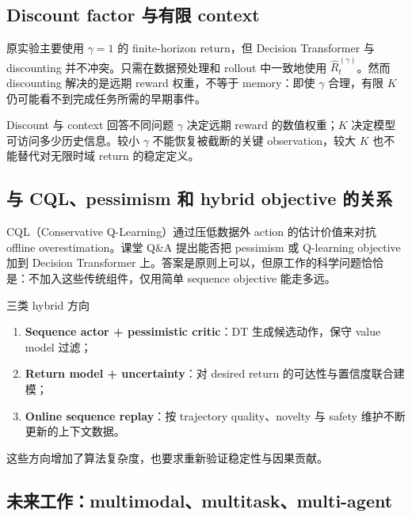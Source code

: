 
\subsection{Discount factor 与有限 context}

原实验主要使用 $\gamma=1$ 的 finite-horizon return，但 Decision Transformer 与 discounting 并不冲突。只需在数据预处理和 rollout 中一致地使用 $\widehat{R}^{(\gamma)}_t$。然而 discounting 解决的是远期 reward 权重，不等于 memory：即使 $\gamma$ 合理，有限 $K$ 仍可能看不到完成任务所需的早期事件。

\begin{importantbox}{Discount 与 context 回答不同问题}
$\gamma$ 决定远期 reward 的数值权重；$K$ 决定模型可访问多少历史信息。较小 $\gamma$ 不能恢复被截断的关键 observation，较大 $K$ 也不能替代对无限时域 return 的稳定定义。
\end{importantbox}

\subsection{与 CQL、pessimism 和 hybrid objective 的关系}

CQL（Conservative Q-Learning）通过压低数据外 action 的估计价值来对抗 offline overestimation。课堂 Q\&A 提出能否把 pessimism 或 Q-learning objective 加到 Decision Transformer 上。答案是原则上可以，但原工作的科学问题恰恰是：不加入这些传统组件，仅用简单 sequence objective 能走多远。

\begin{knowledgebox}{三类 hybrid 方向}
\begin{enumerate}
  \item \textbf{Sequence actor + pessimistic critic}：DT 生成候选动作，保守 value model 过滤；
  \item \textbf{Return model + uncertainty}：对 desired return 的可达性与置信度联合建模；
  \item \textbf{Online sequence replay}：按 trajectory quality、novelty 与 safety 维护不断更新的上下文数据。
\end{enumerate}
这些方向增加了算法复杂度，也要求重新验证稳定性与因果贡献。
\end{knowledgebox}

\subsection{未来工作：multimodal、multitask、multi-agent}

